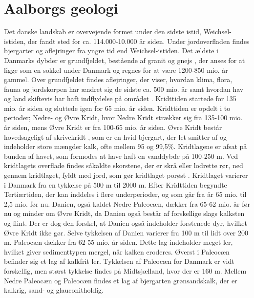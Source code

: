 \section{Aalborgs geologi}
Det danske landskab er overvejende formet under den sidste istid, Weichsel-istiden, der fandt sted for ca. 114.000-10.000 år siden. Under jordoverfladen findes bjergarter og aflejringer fra yngre tid end Weichsel-istiden. Det ældste i Danmarks dybder er grundfjeldet, bestående af granit og gnejs \citep{geopdf}, der anses for at ligge som en sokkel under Danmark og regnes for at være 1200-850 mio. år gammel. Over grundfjeldet findes aflejringer, der viser, hvordan klima, flora, fauna og jordskorpen har ændret sig de sidste ca. 500 mio. år samt hvordan hav og land skiftevis har haft indflydelse på området \citep{geolink}.
\newline
\newline
Kridttiden startede for 135 mio. år siden og sluttede igen for 65 mio. år siden. Kridttiden er opdelt i to perioder; Nedre- og Øvre Kridt, hvor Nedre Kridt strækker sig fra 135-100 mio. år siden, mens Øvre Kridt er fra 100-65 mio. år siden.  Øvre Kridt består hovedsageligt af skrivekridt \citep{geopdf}, som er en hvid bjergart, der let smitter af og indeholder store mængder kalk, ofte mellem 95 og 99,5\%. Kridtlagene er afsat på bunden af havet, som formodes at have haft en vanddybde på 100-250 m. Ved kridtlagets overflade findes såkaldte skorstene, der er skrå eller lodrette rør, ned gennem kridtlaget, fyldt med jord, som gør kridtlaget porøst \citep[ s. 15-16]{geobog}. Kridtlaget varierer i Danmark fra en tykkelse på 500 m til 2000 m.
\newline
\newline
Efter Kridttiden begyndte Tertiærtiden, der kan inddeles i flere underperioder, og som går fra år 65 mio. til 2,5 mio. før nu. Danien, også kaldet Nedre Paleocæn, dækker fra 65-62 mio. år før nu og minder om Øvre Kridt, da Danien også består af forskellige slags kalksten og flint. Der er dog den forskel, at Danien også indeholder forstenede dyr, hvilket Øvre Kridt ikke gør. Selve tykkelsen af Danien varierer fra 100 m til lidt over 200 m. Paleocæn dækker fra 62-55 mio. år siden. Dette lag indeholder meget ler, hvilket giver sedimenttypen mergel, når kalken eroderes. Øverst i Paleocæn befinder sig et lag af kalkfrit ler. Tykkelsen af Paleocæn for Danmark er vidt forskellig, men størst tykkelse findes på Midtsjælland, hvor der er 160 m. Mellem Nedre Paleocæn og Paleocæn findes et lag af bjergarten grønsandskalk, der er kalkrig, sand- og glauconitholdig.
